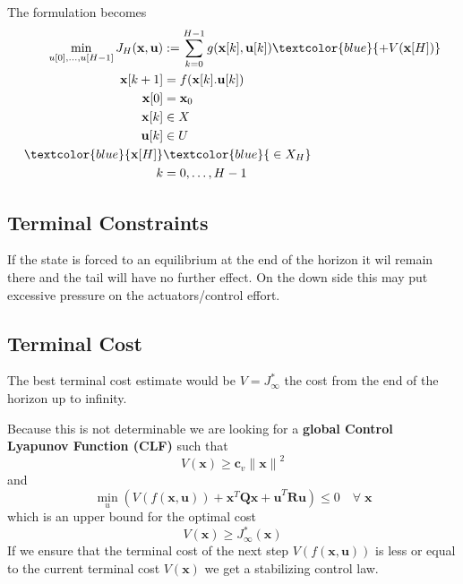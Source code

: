 The formulation becomes
\begin{align*}
    \min_{u[0], \ldots, u[H-1]} J_{H}(\mathbf{x,u}) & := \sum_{k=0}^{H-1}g(\mathbf{x}[k],\mathbf{u}[k]) \textcolor{blue}{+V(\textbf{x}[H])} \\
    \mathbf{x}[k+1]                                 & = f(\mathbf{x}[k]. \mathbf{u}[k])                                                     \\
    \mathbf{x}[0]                                   & = \mathbf{x}_0                                                                        \\
    \mathbf{x}[k]                                   & \in X                                                                                 \\
    \mathbf{u}[k]                                   & \in U                                                                                 \\
    \textcolor{blue}{\mathbf{x}[H]}                 & \textcolor{blue}{\;\in X_H}                                                           \\
    k                                               & = 0,\ldots,H-1
\end{align*}

\subsection{Terminal Constraints}\label{mpc_terminal_constraint}

If the state is forced to an equilibrium at the end of the horizon it wil remain there and the tail will have no further effect. On the down side this may put excessive pressure on the actuators/control effort.

\subsection{Terminal Cost}\label{mpc_terminal_cost}

The best terminal cost estimate would be $V = J^*_\infty$ the cost from the end of the horizon up to infinity.

Because this is not determinable we are looking for a \textbf{global Control Lyapunov Function (CLF)} such that
\begin{equation*}
    V(\mathbf{x}) \geq \mathbf{c}_v {\lVert \mathbf{x} \rVert}^2
\end{equation*}
and
\begin{equation*}
    \min_{u}(V(f(\mathbf{x,u})) + \mathbf{x}^T \mathbf{Qx + u}^T \mathbf{R u}) \leq 0 \quad \forall \; \mathbf{x}
\end{equation*}
which is an upper bound for the optimal cost
\begin{equation*}
    V(\mathbf{x}) \geq J^*_\infty (\mathbf{x})
\end{equation*}
If we ensure that the terminal cost of the next step $V(f(\mathbf{x,u}))$ is less or equal to the current terminal cost $V(\mathbf{x})$ we get a stabilizing control law.

